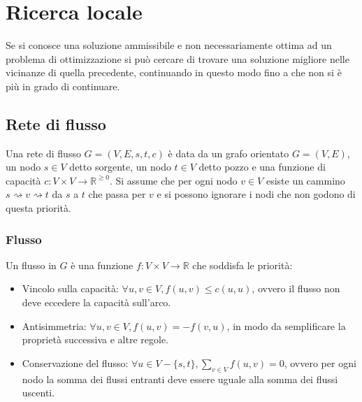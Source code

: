 \chapter{Ricerca locale}
Se si conosce una soluzione ammissibile e non necessariamente ottima ad un problema di ottimizzazione si pu\`o cercare di trovare una soluzione migliore nelle vicinanze di quella
precedente, continuando in questo modo fino a che non si \`e pi\`u in grado di continuare.\\

\section{Rete di flusso}
Una rete di flusso $G=(V, E, s, t, c)$ \`e data da un grafo orientato $G=(V, E)$, un nodo $s\in V$ detto sorgente, un nodo $t\in V$ detto pozzo e una funzione di capacit\`a $c:V\times V
\rightarrow\mathbb{R}^{\ge 0}$. Si assume che per ogni nodo $v\in V$ esiste un cammino $s \rightsquigarrow v \rightsquigarrow t$ da $s$ a $t$ che passa per $v$ e si possono ignorare i 
nodi che non godono di questa priorit\`a.
\subsection{Flusso}
Un flusso in $G$ \`e una funzione $f:V\times V\rightarrow\mathbb{R}$ che soddisfa le priorit\`a:
\begin{itemize}
	\item Vincolo sulla capacit\`a: $\forall u, v\in V, f(u, v)\le c(u, u)$, ovvero il flusso non deve eccedere la capacit\`a sull'arco.
	\item Antisimmetria: $\forall u, v\in V, f(u, v) = -f(v, u)$, in modo da semplificare la propriet\`a successiva e altre regole.
	\item Conservazione del flusso: $\forall u\in V - \{s, t\}, \sum\limits_{v\in V} f(u, v) = 0$, ovvero per ogni nodo la somma dei flussi entranti deve essere uguale alla somma dei
		flussi uscenti. 
\end{itemize}
